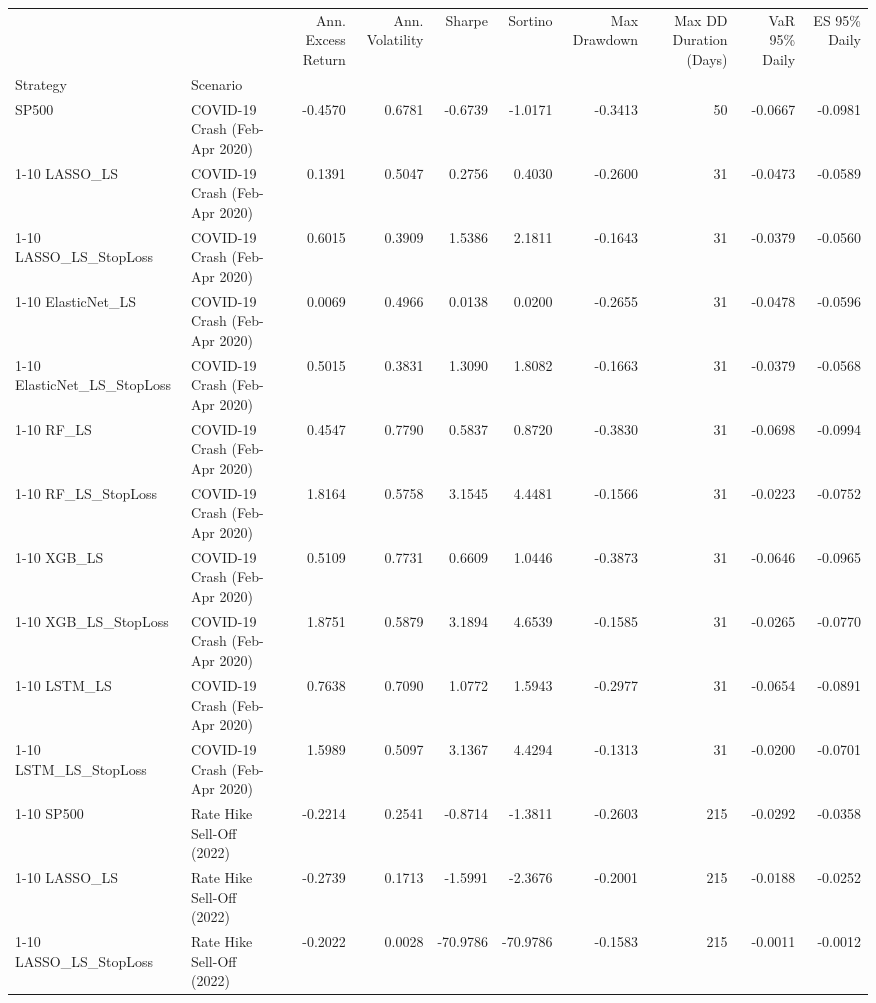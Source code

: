 \begin{tabular}{llrrrrrrrr}
\toprule
 &  & Ann. Excess Return & Ann. Volatility & Sharpe & Sortino & Max Drawdown & Max DD Duration (Days) & VaR 95\% Daily & ES 95\% Daily \\
Strategy & Scenario &  &  &  &  &  &  &  &  \\
\midrule
SP500 & COVID-19 Crash (Feb-Apr 2020) & -0.4570 & 0.6781 & -0.6739 & -1.0171 & -0.3413 & 50 & -0.0667 & -0.0981 \\
\cline{1-10}
LASSO\_LS & COVID-19 Crash (Feb-Apr 2020) & 0.1391 & 0.5047 & 0.2756 & 0.4030 & -0.2600 & 31 & -0.0473 & -0.0589 \\
\cline{1-10}
LASSO\_LS\_StopLoss & COVID-19 Crash (Feb-Apr 2020) & 0.6015 & 0.3909 & 1.5386 & 2.1811 & -0.1643 & 31 & -0.0379 & -0.0560 \\
\cline{1-10}
ElasticNet\_LS & COVID-19 Crash (Feb-Apr 2020) & 0.0069 & 0.4966 & 0.0138 & 0.0200 & -0.2655 & 31 & -0.0478 & -0.0596 \\
\cline{1-10}
ElasticNet\_LS\_StopLoss & COVID-19 Crash (Feb-Apr 2020) & 0.5015 & 0.3831 & 1.3090 & 1.8082 & -0.1663 & 31 & -0.0379 & -0.0568 \\
\cline{1-10}
RF\_LS & COVID-19 Crash (Feb-Apr 2020) & 0.4547 & 0.7790 & 0.5837 & 0.8720 & -0.3830 & 31 & -0.0698 & -0.0994 \\
\cline{1-10}
RF\_LS\_StopLoss & COVID-19 Crash (Feb-Apr 2020) & 1.8164 & 0.5758 & 3.1545 & 4.4481 & -0.1566 & 31 & -0.0223 & -0.0752 \\
\cline{1-10}
XGB\_LS & COVID-19 Crash (Feb-Apr 2020) & 0.5109 & 0.7731 & 0.6609 & 1.0446 & -0.3873 & 31 & -0.0646 & -0.0965 \\
\cline{1-10}
XGB\_LS\_StopLoss & COVID-19 Crash (Feb-Apr 2020) & 1.8751 & 0.5879 & 3.1894 & 4.6539 & -0.1585 & 31 & -0.0265 & -0.0770 \\
\cline{1-10}
LSTM\_LS & COVID-19 Crash (Feb-Apr 2020) & 0.7638 & 0.7090 & 1.0772 & 1.5943 & -0.2977 & 31 & -0.0654 & -0.0891 \\
\cline{1-10}
LSTM\_LS\_StopLoss & COVID-19 Crash (Feb-Apr 2020) & 1.5989 & 0.5097 & 3.1367 & 4.4294 & -0.1313 & 31 & -0.0200 & -0.0701 \\
\cline{1-10}
SP500 & Rate Hike Sell-Off (2022) & -0.2214 & 0.2541 & -0.8714 & -1.3811 & -0.2603 & 215 & -0.0292 & -0.0358 \\
\cline{1-10}
LASSO\_LS & Rate Hike Sell-Off (2022) & -0.2739 & 0.1713 & -1.5991 & -2.3676 & -0.2001 & 215 & -0.0188 & -0.0252 \\
\cline{1-10}
LASSO\_LS\_StopLoss & Rate Hike Sell-Off (2022) & -0.2022 & 0.0028 & -70.9786 & -70.9786 & -0.1583 & 215 & -0.0011 & -0.0012 \\

\end{tabular}
